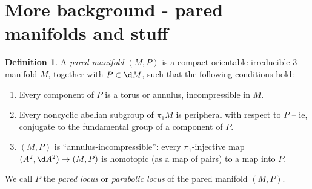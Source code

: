 \documentclass[12pt]{amsart}
\theoremstyle{definition}
\newtheorem{Def}[theorem]{Definition}
\begin{document}
%
%
%
%

\section{More background - pared manifolds and stuff}

%
\begin{Def}

A \emph{pared manifold} $(M,P)$ is a compact orientable irreducible 3-manifold
$M$, together with $P\in\d M$, such that the following conditions hold:

\begin{enumerate}
\item Every component of $P$ is a torus or annulus, incompressible in $M$.
\item Every noncyclic abelian subgroup of $\pi_1M$ is peripheral with respect to
$P$ --
ie, conjugate to the fundamental group of a component of $P$.
\item $(M,P)$ is ``annulus-incompressible'': every $\pi_1$-injective map $(A^2,
\d A^2) \to
(M,P)$ is homotopic (as a map of pairs) to a map into $P$.
\end{enumerate}

We call $P$ the \emph{pared locus} or \emph{parabolic locus} of the pared
manifold $(M,P)$.

\end{Def}
\end{document}
